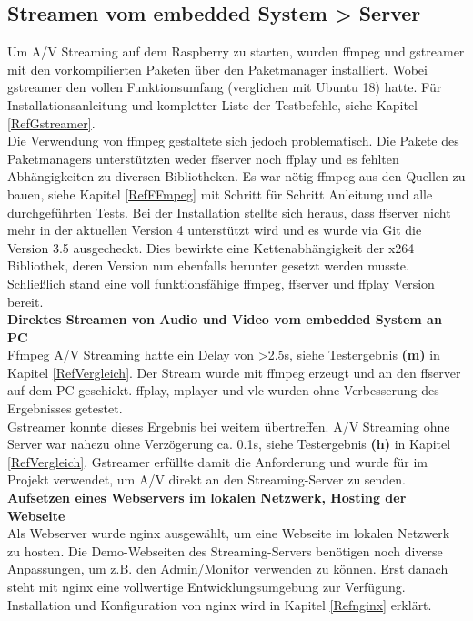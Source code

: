 \subsection{Streamen vom embedded System > Server }
Um A/V Streaming auf dem Raspberry zu starten, wurden ffmpeg und gstreamer mit den 
vorkompilierten Paketen über den Paketmanager installiert. Wobei gstreamer den vollen Funktionsumfang (verglichen mit Ubuntu 18) hatte. Für Installationsanleitung und kompletter Liste der Testbefehle, siehe Kapitel \ref{RefGstreamer}. \\

Die Verwendung von ffmpeg gestaltete sich jedoch problematisch. Die Pakete des Paketmanagers unterstützten weder ffserver noch ffplay und es fehlten Abhängigkeiten zu diversen Bibliotheken. Es war nötig ffmpeg aus den Quellen zu bauen, siehe Kapitel \ref{RefFFmpeg} mit Schritt für Schritt Anleitung und alle durchgeführten Tests. Bei der Installation stellte sich heraus, dass ffserver nicht mehr in der aktuellen Version 4 unterstützt wird und es wurde via Git die Version 3.5 ausgecheckt. Dies bewirkte eine Kettenabhängigkeit der x264 Bibliothek, deren Version nun ebenfalls herunter gesetzt werden musste. Schließlich stand eine voll funktionsfähige ffmpeg, ffserver und ffplay Version bereit.\\ 

\textbf{Direktes Streamen von Audio und Video vom embedded System an PC}\\
Ffmpeg A/V Streaming hatte ein Delay von >2.5s, siehe Testergebnis \textbf{(m)} in Kapitel \ref{RefVergleich}. Der Stream wurde mit ffmpeg erzeugt und an den ffserver auf dem PC geschickt. ffplay, mplayer und vlc wurden ohne Verbesserung des Ergebnisses getestet.\\
Gstreamer konnte dieses Ergebnis bei weitem übertreffen. A/V Streaming ohne Server war nahezu ohne Verzögerung ca. 0.1s, siehe Testergebnis \textbf{(h)} in Kapitel \ref{RefVergleich}. Gstreamer erfüllte damit die Anforderung und wurde für im Projekt verwendet, um A/V direkt an den Streaming-Server zu senden. \\

\textbf{Aufsetzen eines Webservers im lokalen Netzwerk, Hosting der Webseite}\\
Als Webserver wurde nginx ausgewählt, um eine Webseite im lokalen Netzwerk zu hosten. Die Demo-Webseiten des Streaming-Servers benötigen noch diverse Anpassungen, um z.B. den Admin/Monitor verwenden zu können. Erst danach steht mit nginx eine vollwertige Entwicklungsumgebung zur Verfügung. Installation und Konfiguration von nginx wird in Kapitel \ref{Refnginx} erklärt. \\

